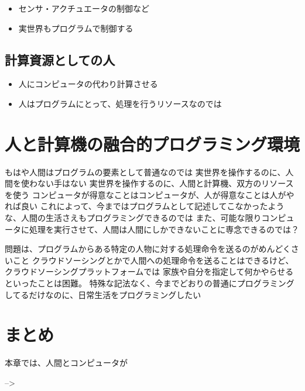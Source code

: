 \begin{itemize}
\itemsep1pt\parskip0pt
\item
  センサ・アクチュエータの制御など
\item
  実世界もプログラムで制御する
\end{itemize}

\subsection{計算資源としての人}\label{ux8a08ux7b97ux8cc7ux6e90ux3068ux3057ux3066ux306eux4eba}

\begin{itemize}
\itemsep1pt\parskip0pt
\item
  人にコンピュータの代わり計算させる
\item
  人はプログラムにとって、処理を行うリソースなのでは
\end{itemize}

\section{人と計算機の融合的プログラミング環境}\label{ux4ebaux3068ux8a08ux7b97ux6a5fux306eux878dux5408ux7684ux30d7ux30edux30b0ux30e9ux30dfux30f3ux30b0ux74b0ux5883}

もはや人間はプログラムの要素として普通なのでは
実世界を操作するのに、人間を使わない手はない
実世界を操作するのに、人間と計算機、双方のリソースを使う
コンピュータが得意なことはコンピュータが、人が得意なことは人がやれば良い
これによって、今まではプログラムとして記述してこなかったような、人間の生活さえもプログラミングできるのでは
また、可能な限りコンピュータに処理を実行させて、人間は人間にしかできないことに専念できるのでは？

問題は、プログラムからある特定の人物に対する処理命令を送るのがめんどくさいこと
クラウドソーシングとかで人間への処理命令を送ることはできるけど、クラウドソーシングプラットフォームでは
家族や自分を指定して何かやらせるといったことは困難。
特殊な記法なく、今までどおりの普通にプログラミングしてるだけなのに、日常生活をプログラミングしたい

\section{まとめ}\label{ux307eux3068ux3081}

本章では、人間とコンピュータが

--\textgreater{}
